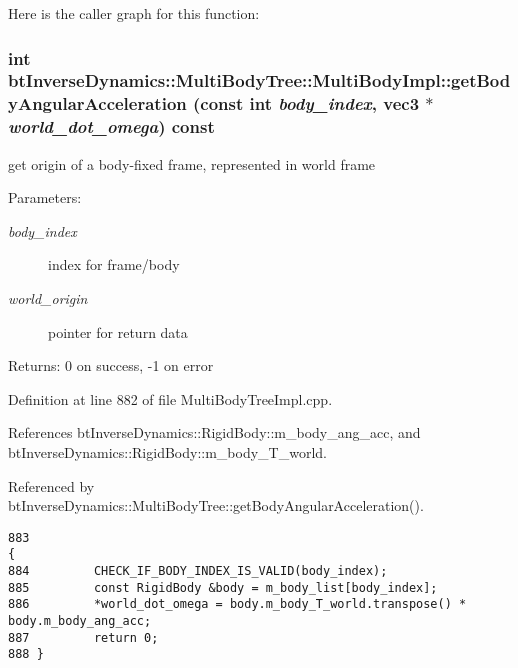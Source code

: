 Here is the caller graph for this function:\hypertarget{classbt_inverse_dynamics_1_1_multi_body_tree_1_1_multi_body_impl_b63dfaa8b761e8258317835648c78358}{
\subsubsection[getBodyAngularAcceleration]{\setlength{\rightskip}{0pt plus 5cm}int btInverseDynamics::MultiBodyTree::MultiBodyImpl::getBodyAngularAcceleration (const int {\em body\_\-index}, \/  {\bf vec3} $\ast$ {\em world\_\-dot\_\-omega}) const}}
\label{classbt_inverse_dynamics_1_1_multi_body_tree_1_1_multi_body_impl_b63dfaa8b761e8258317835648c78358}


get origin of a body-fixed frame, represented in world frame \begin{Desc}
\item[Parameters:]
\begin{description}
\item[{\em body\_\-index}]index for frame/body \item[{\em world\_\-origin}]pointer for return data \end{description}
\end{Desc}
\begin{Desc}
\item[Returns:]0 on success, -1 on error \end{Desc}
 

Definition at line 882 of file MultiBodyTreeImpl.cpp.

References btInverseDynamics::RigidBody::m\_\-body\_\-ang\_\-acc, and btInverseDynamics::RigidBody::m\_\-body\_\-T\_\-world.

Referenced by btInverseDynamics::MultiBodyTree::getBodyAngularAcceleration().

\begin{Code}\begin{verbatim}883                                                                                                                                                       {
884         CHECK_IF_BODY_INDEX_IS_VALID(body_index);
885         const RigidBody &body = m_body_list[body_index];
886         *world_dot_omega = body.m_body_T_world.transpose() * body.m_body_ang_acc;
887         return 0;
888 }
\end{verbatim}
\end{Code}




